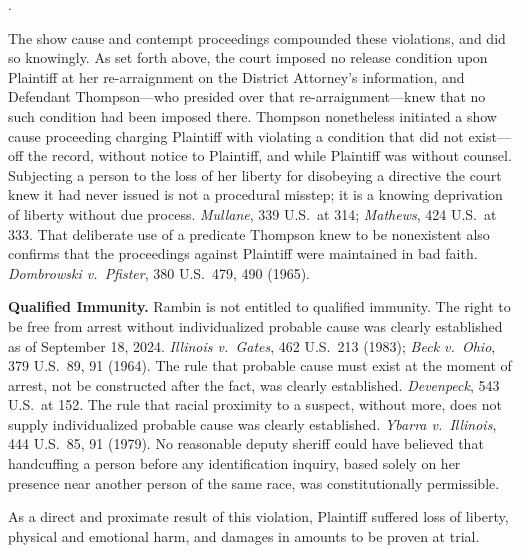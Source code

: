 \documentclass[12pt,letterpaper]{article}
\newcounter{complaintpara}
\newenvironment{paras}{%
	\begin{list}{\arabic{complaintpara}.}{%
			\setlength{\leftmargin}{0.5in}%
			\setlength{\labelwidth}{0.4in}%
			\setlength{\labelsep}{0.1in}%
			\setlength{\itemsep}{0pt}%
			\setlength{\parsep}{0pt}%
			\setlength{\topsep}{6pt}%
		}%
	}{%
	\end{list}%
}
\begin{document}
\begin{paras}
		\item The show cause and contempt proceedings compounded these violations, and did so knowingly. As set forth above, the court imposed no release condition upon Plaintiff at her re-arraignment on the District Attorney's information, and Defendant Thompson---who presided over that re-arraignment---knew that no such condition had been imposed there. Thompson nonetheless initiated a show cause proceeding charging Plaintiff with violating a condition that did not exist---off the record, without notice to Plaintiff, and while Plaintiff was without counsel. Subjecting a person to the loss of her liberty for disobeying a directive the court knew it had never issued is not a procedural misstep; it is a knowing deprivation of liberty without due process. \textit{Mullane}, 339 U.S.\ at 314; \textit{Mathews}, 424 U.S.\ at 333. That deliberate use of a predicate Thompson knew to be nonexistent also confirms that the proceedings against Plaintiff were maintained in bad faith. \textit{Dombrowski v.\ Pfister}, 380 U.S.\ 479, 490 (1965).

		\item \textbf{Qualified Immunity.} Rambin is not entitled to
		qualified immunity. The right to be free from arrest without
		individualized probable cause was clearly established as of
		September 18, 2024. \textit{Illinois v.\ Gates}, 462 U.S.\ 213
		(1983); \textit{Beck v.\ Ohio}, 379 U.S.\ 89, 91 (1964). The
		rule that probable cause must exist at the moment of arrest,
		not be constructed after the fact, was clearly established.
		\textit{Devenpeck}, 543 U.S.\ at 152. The rule that racial
		proximity to a suspect, without more, does not supply
		individualized probable cause was clearly established.
		\textit{Ybarra v.\ Illinois}, 444 U.S.\ 85, 91 (1979). No
		reasonable deputy sheriff could have believed that handcuffing
		a person before any identification inquiry, based solely on
		her presence near another person of the same race, was
		constitutionally permissible.
		
		\item As a direct and proximate result of this violation,
		Plaintiff suffered loss of liberty, physical and emotional
		harm, and damages in amounts to be proven at trial.
		
	\end{paras}
\end{document}
